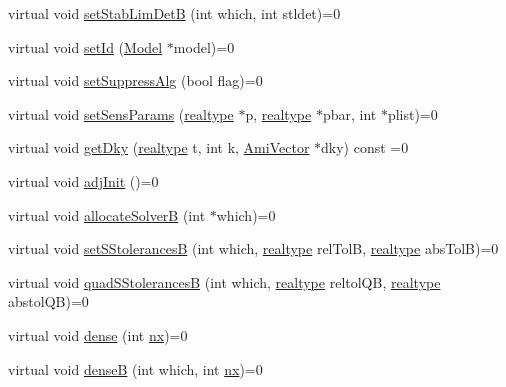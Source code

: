 \begin{DoxyCompactItemize}
virtual void \mbox{\hyperlink{classamici_1_1_solver_acb7f8ad7671faf5fa7e5fa7851e662ec}{set\+Stab\+Lim\+DetB}} (int which, int stldet)=0
\item 
virtual void \mbox{\hyperlink{classamici_1_1_solver_a5c1ec0904b36a63c3d8adc74ffbb3718}{set\+Id}} (\mbox{\hyperlink{classamici_1_1_model}{Model}} $\ast$model)=0
\item 
virtual void \mbox{\hyperlink{classamici_1_1_solver_aaf6b0aa0540ff3600fdcc555f721e147}{set\+Suppress\+Alg}} (bool flag)=0
\item 
virtual void \mbox{\hyperlink{classamici_1_1_solver_ac729d2b36333e1bb658a1ca1a717bd9a}{set\+Sens\+Params}} (\mbox{\hyperlink{namespaceamici_a1bdce28051d6a53868f7ccbf5f2c14a3}{realtype}} $\ast$p, \mbox{\hyperlink{namespaceamici_a1bdce28051d6a53868f7ccbf5f2c14a3}{realtype}} $\ast$pbar, int $\ast$plist)=0
\item 
virtual void \mbox{\hyperlink{classamici_1_1_solver_abea88e1516775b1307f8ad837913ebc0}{get\+Dky}} (\mbox{\hyperlink{namespaceamici_a1bdce28051d6a53868f7ccbf5f2c14a3}{realtype}} t, int k, \mbox{\hyperlink{classamici_1_1_ami_vector}{Ami\+Vector}} $\ast$dky) const =0
\item 
virtual void \mbox{\hyperlink{classamici_1_1_solver_a5c0a23a7a9c8d21c76e0b1e6ef6e1947}{adj\+Init}} ()=0
\item 
virtual void \mbox{\hyperlink{classamici_1_1_solver_adb86fe4b29dd9c370bccee609b8deba3}{allocate\+SolverB}} (int $\ast$which)=0
\item 
virtual void \mbox{\hyperlink{classamici_1_1_solver_abc7770e462f49fb8de643ab46ab94985}{set\+S\+StolerancesB}} (int which, \mbox{\hyperlink{namespaceamici_a1bdce28051d6a53868f7ccbf5f2c14a3}{realtype}} rel\+TolB, \mbox{\hyperlink{namespaceamici_a1bdce28051d6a53868f7ccbf5f2c14a3}{realtype}} abs\+TolB)=0
\item 
virtual void \mbox{\hyperlink{classamici_1_1_solver_afe71105db4de90ce12a37309b252101e}{quad\+S\+StolerancesB}} (int which, \mbox{\hyperlink{namespaceamici_a1bdce28051d6a53868f7ccbf5f2c14a3}{realtype}} reltol\+QB, \mbox{\hyperlink{namespaceamici_a1bdce28051d6a53868f7ccbf5f2c14a3}{realtype}} abstol\+QB)=0
\item 
virtual void \mbox{\hyperlink{classamici_1_1_solver_ae98355a8a81e3b54c362413e0de2adbc}{dense}} (int \mbox{\hyperlink{classamici_1_1_solver_a86a18c4e461de76881b6af72e4feb8d9}{nx}})=0
\item 
virtual void \mbox{\hyperlink{classamici_1_1_solver_aaa1ecd357b3facae2f2d12784563ad25}{denseB}} (int which, int \mbox{\hyperlink{classamici_1_1_solver_a86a18c4e461de76881b6af72e4feb8d9}{nx}})=0

\end{DoxyCompactItemize}
